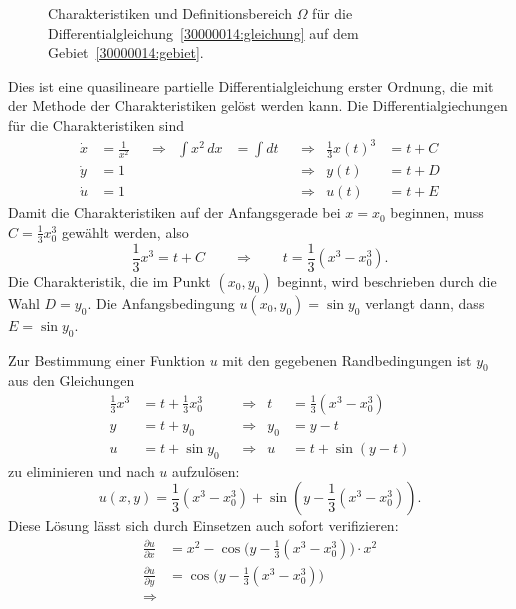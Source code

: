 \begin{loesung}
\begin{figure}
\centering
{}
\caption{Charakteristiken und Definitionsbereich $\Omega$
für die Differentialgleichung~\eqref{30000014:gleichung}
auf dem Gebiet~\eqref{30000014:gebiet}.
\label{30000014:domain}
}
\end{figure}
Dies ist eine quasilineare partielle Differentialgleichung erster Ordnung, die
mit der Methode der Charakteristiken gelöst werden kann.
Die Differentialgiechungen für die Charakteristiken sind
\[
\begin{aligned}
\dot x &= \frac1{x^2} &&\Rightarrow& \int x^2\,dx &=\int dt &&\Rightarrow& \frac13 x(t)^3 &= t + C
\\
\dot y &= 1           &&           &              &         &&\Rightarrow& y(t) &= t + D
\\
\dot u &= 1           &&           &              &         &&\Rightarrow& u(t) &= t + E
\end{aligned}
\]
Damit die Charakteristiken auf der Anfangsgerade bei $x=x_0$ beginnen, muss
$C=\frac13x_0^3$ gewählt werden, also
\[
\frac13 x^3 = t + C
\qquad\Rightarrow\qquad
t = \frac13(x^3-x_0^3).
\]
Die Charakteristik, die im Punkt $(x_0,y_0)$ beginnt, wird beschrieben durch
die Wahl $D=y_0$.
Die Anfangsbedingung $u(x_0,y_0)=\sin y_0 $
verlangt dann, dass $E=\sin y_0 $.
\begin{teilaufgaben}
\item Zur Bestimmung einer Funktion $u$ mit den gegebenen Randbedingungen
ist $y_0$ aus den Gleichungen
\[
\begin{aligned}
{\textstyle\frac13}x^3 &= t + {\textstyle\frac13}x_0^3 &&\Rightarrow& t   &= \textstyle{\frac13}(x^3-x_0^3) \\
y           &= t + y_0          &&\Rightarrow& y_0 &= y - t              \\
u           &= t + \sin y_0     &&\Rightarrow& u   &= t + \sin(y-t)
\end{aligned}
\]
zu eliminieren und nach $u$ aufzulösen:
\[
u(x,y) = 
{\textstyle \frac13}(x^3-x_0^3)
+
\sin (y-{\textstyle \frac13}(x^3-x_0^3)).
\]
Diese Lösung lässt sich durch Einsetzen auch sofort verifizieren:
\begin{align*}
\frac{\partial u}{\partial x}
&=
x^2 -
\cos\bigl(y-{\textstyle\frac13}(x^3-x_0^3)\bigr)
\cdot x^2
\\
\frac{\partial u}{\partial y}
&=
\cos\bigl(y-{\textstyle\frac13}(x^3-x_0^3)\bigr)
\\
\Rightarrow

\end{align*}
\end{teilaufgaben}
\end{loesung}
